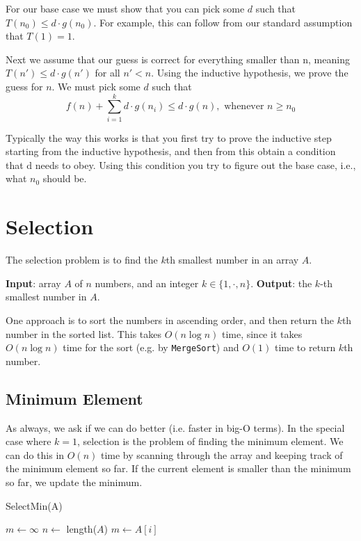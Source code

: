 \documentclass [12pt]{article}
\begin{document}
For our base case we must show that you can pick some $d$ such that $T(n_0) \leq d \cdot g(n_0)$. For example, this can follow from our standard assumption that $T(1) = 1$.

Next we assume that our guess is correct for everything smaller than n, meaning $T(n') \leq d \cdot g(n')$ for all $n' < n$. Using the inductive hypothesis, we prove the guess for $n$. We must pick some $d$ such that
$$
f(n) + \sum_{i=1}^k d \cdot g(n_i) \leq d \cdot g(n), \text{ whenever } n \geq n_0
$$

Typically the way this works is that you first try to prove the inductive step starting from the inductive hypothesis, and then from this obtain a condition that d needs to obey. Using this condition you try to figure out the base case, i.e., what $n_0$ should be.

\section{Selection}
The selection problem is to find the $k$th smallest number in an array $A$.

\textbf{Input}: array $A$ of $n$ numbers, and an integer $k \in \{1, \cdot , n\}$.
\textbf{Output}: the $k$-th smallest number in $A$.

One approach is to sort the numbers in ascending order, and then return the $k$th number in the sorted list. This takes $O(n \log n)$ time, since it takes $O(n \log n)$ time for the sort (e.g. by \texttt{MergeSort}) and $O(1)$ time to return $k$th number.

\subsection{Minimum Element}
As always, we ask if we can do better (i.e. faster in big-O terms). In the special case where $k = 1$, selection is the problem of finding the minimum element. We can do this in $O(n)$ time by scanning through the array and keeping track of the minimum element so far. If the current element is smaller than the minimum so far, we update the minimum.

\begin{algorithm}
\caption{SelectMin(A)}\label{alg:min}
\begin{algorithmic}
\STATE $m \gets \infty$
\STATE $n \gets $ length($A$)
        \STATE $m \gets A[i]$
    \ENDIF
\ENDFOR
\end{algorithmic}
\end{algorithm}
\end{document}
